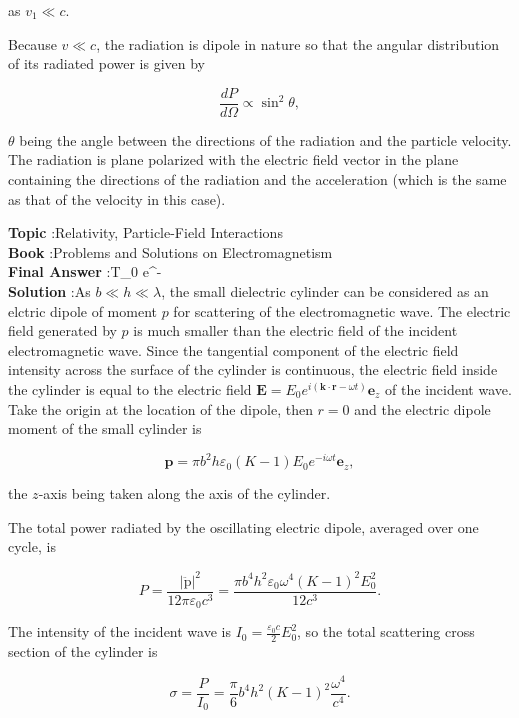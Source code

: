 \documentclass[10pt]{article}
\begin{document}
as $v_{1} \ll c$.

Because $v \ll c$, the radiation is dipole in nature so that the angular distribution of its radiated power is given by

$$
\frac{d P}{d \Omega} \propto \sin ^{2} \theta,
$$

$\theta$ being the angle between the directions of the radiation and the particle velocity. The radiation is plane polarized with the electric field vector in the plane containing the directions of the radiation and the acceleration (which is the same as that of the velocity in this case).

\textbf{Topic} :Relativity, Particle-Field Interactions\\
\textbf{Book} :Problems and Solutions on Electromagnetism\\
\textbf{Final Answer} :T_{0} e^{-}\\


\textbf{Solution} :As $b \ll h \ll \lambda$, the small dielectric cylinder can be considered as an elctric dipole of moment $p$ for scattering of the electromagnetic wave. The electric field generated by $p$ is much smaller than the electric field of the incident electromagnetic wave. Since the tangential component of the electric field intensity across the surface of the cylinder is continuous, the electric field inside the cylinder is equal to the electric field $\mathbf{E}=E_{0} e^{i(\mathbf{k} \cdot \mathbf{r}-\omega t)} \mathbf{e}_{z}$ of the incident wave. Take the origin at the location of the dipole, then $r=0$ and the electric dipole moment of the small cylinder is

$$
\mathbf{p}=\pi b^{2} h \varepsilon_{0}(K-1) E_{0} e^{-i \omega t} \mathbf{e}_{z},
$$

the $z$-axis being taken along the axis of the cylinder.

The total power radiated by the oscillating electric dipole, averaged over one cycle, is

$$
P=\frac{|\ddot{\mathrm{p}}|^{2}}{12 \pi \varepsilon_{0} c^{3}}=\frac{\pi b^{4} h^{2} \varepsilon_{0} \omega^{4}(K-1)^{2} E_{0}^{2}}{12 c^{3}} .
$$

The intensity of the incident wave is $I_{0}=\frac{\varepsilon_{0} c}{2} E_{0}^{2}$, so the total scattering cross section of the cylinder is

$$
\sigma=\frac{P}{I_{0}}=\frac{\pi}{6} b^{4} h^{2}(K-1)^{2} \frac{\omega^{4}}{c^{4}} .
$$
\end{document}
